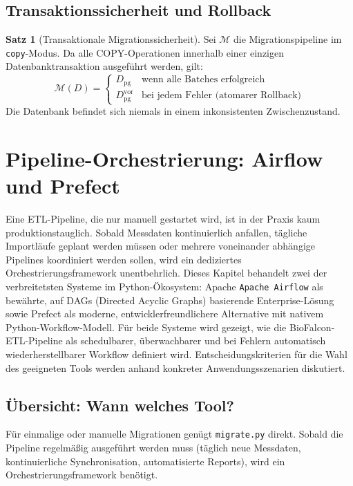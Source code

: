 ﻿\documentclass[12pt,a4paper]{report}
\theoremstyle{definition}
\newtheorem{theorem}{Satz}[section]
\theoremstyle{remark}
\newcommand{\airflow}{\texttt{Apache Airflow}}
\newcommand{\code}[1]{\texttt{#1}}
\begin{document}
\section{Transaktionssicherheit und Rollback}

\begin{theorem}[Transaktionale Migrationssicherheit]
  Sei $\mathcal{M}$ die Migrationspipeline im \code{copy}-Modus.
  Da alle COPY-Operationen innerhalb einer einzigen Datenbanktransaktion
  ausgeführt werden, gilt:
  \[
    \mathcal{M}(D) =
    \begin{cases}
      D_{\text{pg}} & \text{wenn alle Batches erfolgreich} \\
      D_{\text{pg}}^{\text{vor}} & \text{bei jedem Fehler (atomarer Rollback)}
    \end{cases}
  \]
  Die Datenbank befindet sich niemals in einem inkonsistenten
  Zwischenzustand.
\end{theorem}

\chapter{Pipeline-Orchestrierung: Airflow und Prefect}
\label{sec:orchestration}

Eine ETL-Pipeline, die nur manuell gestartet wird, ist in der Praxis kaum produktionstauglich. Sobald Messdaten kontinuierlich anfallen, tägliche Importläufe geplant werden müssen oder mehrere voneinander abhängige Pipelines koordiniert werden sollen, wird ein dediziertes Orchestrierungsframework unentbehrlich. Dieses Kapitel behandelt zwei der verbreitetsten Systeme im Python-Ökosystem: Apache \airflow{} als bewährte, auf DAGs (Directed Acyclic Graphs) basierende Enterprise-Lösung sowie Prefect als moderne, entwicklerfreundlichere Alternative mit nativem Python-Workflow-Modell. Für beide Systeme wird gezeigt, wie die BioFalcon-ETL-Pipeline als schedulbarer, überwachbarer und bei Fehlern automatisch wiederherstellbarer Workflow definiert wird. Entscheidungskriterien für die Wahl des geeigneten Tools werden anhand konkreter Anwendungsszenarien diskutiert.

\section{Übersicht: Wann welches Tool?}

Für einmalige oder manuelle Migrationen genügt \code{migrate.py}
direkt. Sobald die Pipeline regelmä\ss{}ig ausgeführt werden muss
(täglich neue Messdaten, kontinuierliche Synchronisation, automatisierte
Reports), wird ein Orchestrierungsframework ben\"otigt.
\end{document}

